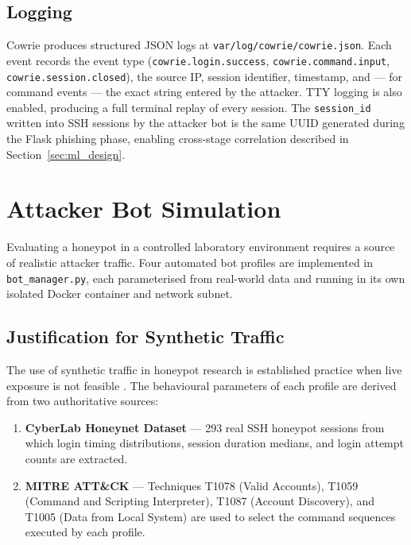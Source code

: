 \subsection{Logging}

Cowrie produces structured JSON logs at
\texttt{var/log/cowrie/cowrie.json}. Each event records the event type
(\texttt{cowrie.login.success}, \texttt{cowrie.command.input},
\texttt{cowrie.session.closed}), the source IP, session identifier, timestamp,
and — for command events — the exact string entered by the attacker. TTY
logging is also enabled, producing a full terminal replay of every session.
The \texttt{session\_id} written into SSH sessions by the attacker bot is the
same UUID generated during the Flask phishing phase, enabling cross-stage
correlation described in Section~\ref{sec:ml_design}.

\section{Attacker Bot Simulation}
\label{sec:bots}

Evaluating a honeypot in a controlled laboratory environment requires a source
of realistic attacker traffic. Four automated bot profiles are implemented in
\texttt{bot\_manager.py}, each parameterised from real-world data and running
in its own isolated Docker container and network subnet.

\subsection{Justification for Synthetic Traffic}

The use of synthetic traffic in honeypot research is established practice when
live exposure is not feasible \cite{Kreibich2005Replay,Alata2006Honeynet}. The
behavioural parameters of each profile are derived from two authoritative
sources:

\begin{enumerate}
    \item \textbf{CyberLab Honeynet Dataset} \cite{Alata2006Honeynet} — 293
    real SSH honeypot sessions from which login timing distributions, session
    duration medians, and login attempt counts are extracted.
    \item \textbf{MITRE ATT\&CK} — Techniques T1078 (Valid Accounts), T1059
    (Command and Scripting Interpreter), T1087 (Account Discovery), and T1005
    (Data from Local System) are used to select the command sequences executed
    by each profile.
\end{enumerate}

